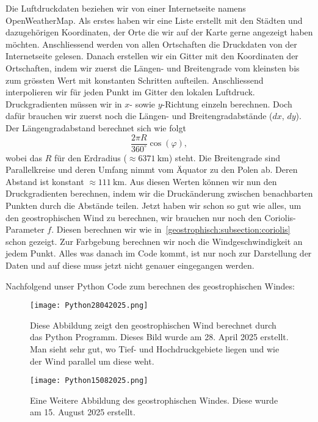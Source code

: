 Die Luftdruckdaten beziehen wir von einer Internetseite namens OpenWeatherMap.
%
%
Als erstes haben wir eine Liste erstellt mit den Städten und dazugehörigen Koordinaten, der Orte die wir auf der Karte gerne angezeigt haben möchten.
Anschliessend werden von allen Ortschaften die Druckdaten von der Internetseite gelesen.
Danach erstellen wir ein Gitter mit den Koordinaten der Ortschaften, indem wir zuerst die Längen- und Breitengrade vom kleinsten bis zum grössten Wert mit konstanten Schritten aufteilen.
Anschliessend interpolieren wir für jeden Punkt im Gitter den lokalen Luftdruck.
Druckgradienten müssen wir in \(x\)- sowie \(y\)-Richtung einzeln berechnen.
Doch dafür brauchen wir zuerst noch die Längen- und Breitengradabstände ($dx$, $dy$).
Der Längengradabstand berechnet sich wie folgt
\begin{equation}
	\frac{2 \pi R}{360^\circ} \cos(\varphi), 
\end{equation}
wobei das $R$ für den Erdradius ($\approx\SI{6371}{\kilo\meter}$) steht. 
Die Breitengrade sind Parallelkreise und deren Umfang nimmt vom Äquator zu den Polen ab.
Deren Abstand ist konstant $\approx\SI{111}{\kilo\meter}$.
Aus diesen Werten können wir nun den Druckgradienten berechnen, indem wir die Druckänderung zwischen benachbarten Punkten durch die Abstände teilen.
Jetzt haben wir schon so gut wie alles, um den geostrophischen Wind zu berechnen, wir brauchen nur noch den Coriolis-Parameter $f$.
Diesen berechnen wir wie in~\ref{geostrophisch:subsection:coriolis} schon gezeigt. 
Zur Farbgebung berechnen wir noch die Windgeschwindigkeit an jedem Punkt. 
Alles was danach im Code kommt, ist nur noch zur Darstellung der Daten und auf diese muss jetzt nicht genauer eingegangen werden.

Nachfolgend unser Python Code zum berechnen des geostrophischen Windes: 


\begin{figure}
	\centering
	\texttt{[image: Python28042025.png]}
	\caption{Diese Abbildung zeigt den geostrophischen Wind berechnet durch das Python Programm.
	Dieses Bild wurde am 28. April 2025 erstellt.
	Man sieht sehr gut, wo Tief- und Hochdruckgebiete liegen und wie der Wind parallel um diese weht.}
	\label{bild:28042025}
\end{figure}

\begin{figure}
	\centering
	\texttt{[image: Python15082025.png]}
	\caption{Eine Weitere Abbildung des geostrophischen Windes.
	Diese wurde am 15. August 2025 erstellt.
	}
	\label{bild:15082025}
\end{figure}


